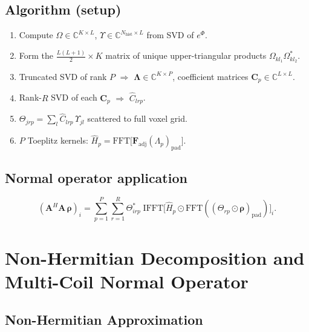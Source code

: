 \documentclass{article}
\begin{document}
\subsection*{Algorithm (setup)}
\begin{enumerate}[label=\arabic*.]
    \item Compute $\Omega \in \mathbb{C}^{K \times L}$, $\Upsilon \in \mathbb{C}^{N_{\mathrm{hist}} \times L}$ from SVD of $e^{\Phi}$.
    \item Form the $\frac{L(L+1)}{2} \times K$ matrix of unique upper-triangular products $\Omega_{kl_1}\Omega_{kl_2}^*$.
    \item Truncated SVD of rank $P$ $\Rightarrow$ $\boldsymbol{\Lambda} \in \mathbb{C}^{K \times P}$, coefficient matrices $\mathbf{C}_p \in \mathbb{C}^{L \times L}$.
    \item Rank-$R$ SVD of each $\mathbf{C}_p$ $\Rightarrow$ $\hat{C}_{lrp}$.
    \item $\Theta_{jrp} = \sum_l \hat{C}_{lrp}\,\Upsilon_{jl}$ scattered to full voxel grid.
    \item $P$ Toeplitz kernels: $\hat{H}_p = \mathrm{FFT}\!\bigl[\mathbf{F}_{\mathrm{adj}}(\Lambda_p)_{\mathrm{pad}}\bigr]$.
\end{enumerate}

\subsection*{Normal operator application}
\begin{equation}
    (\mathbf{A}^H\mathbf{A}\,\boldsymbol{\rho})_i
        = \sum_{p=1}^P \sum_{r=1}^R
            \Theta_{irp}^*\;
            \mathrm{IFFT}\!\bigl[\hat{H}_p \odot \mathrm{FFT}((\Theta_{rp} \odot \boldsymbol{\rho})_{\mathrm{pad}})\bigr]_i.
\end{equation}



\section{Non-Hermitian Decomposition and Multi-Coil Normal Operator}

\subsection{Non-Hermitian Approximation}
\end{document}
